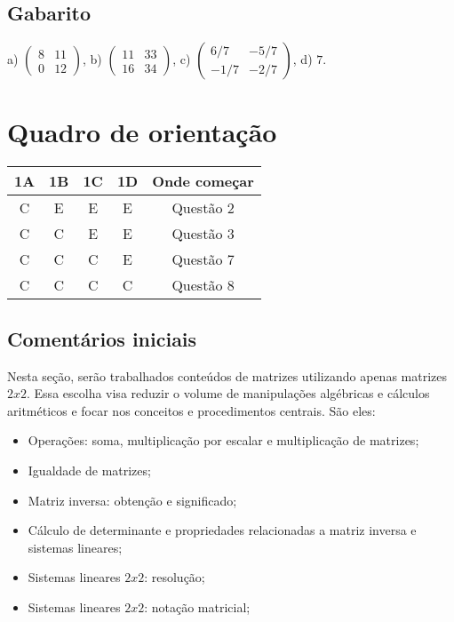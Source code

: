\documentclass[main.tex]{subfiles}
\begin{document}
\paraTutores
\subsection{Gabarito}

a) $\begin{pmatrix}8 & 11 \\ 0 & 12\end{pmatrix}$, b) $\begin{pmatrix}11 & 33 \\ 16 & 34\end{pmatrix}$, c) $\begin{pmatrix}6/7 & -5/7 \\ -1/7 & -2/7\end{pmatrix}$, d) $7$.

\section{Quadro de orientação}

\begin{center}
 \begin{tabular}{|c c c c |c|} 
 \hline
 1A & 1B & 1C & 1D & Onde começar\\
 \hline
 C & E & E & E & Questão 2 \\ 
 \hline
 C & C & E & E & Questão 3 \\ 
 \hline
 C & C & C & E & Questão 7 \\ 
 \hline
 C & C & C & C & Questão 8 \\ 
 \hline
\end{tabular}
\end{center}

\paraTutores

\subsection{Comentários iniciais}

Nesta seção, serão trabalhados conteúdos de matrizes utilizando apenas matrizes $2x2$. Essa escolha visa reduzir o volume de manipulações algébricas e cálculos aritméticos e focar nos conceitos e procedimentos centrais. São eles:

\begin{itemize}
 \item Operações: soma, multiplicação por escalar e multiplicação de matrizes;
 \item Igualdade de matrizes;
 \item Matriz inversa: obtenção e significado;
 \item Cálculo de determinante e propriedades relacionadas a matriz inversa e sistemas lineares;
 \item Sistemas lineares $2x2$: resolução;
 \item Sistemas lineares $2x2$: notação matricial;
\end{itemize}
\end{document}
